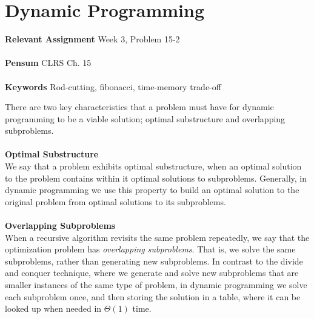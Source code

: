 
\chapter{Dynamic Programming}
\label{ch:dynamicprog}

\textbf{Relevant Assignment} Week 3, Problem 15-2\\\\
\textbf{Pensum} CLRS Ch. 15\\\\
\textbf{Keywords} Rod-cutting, fibonacci, time-memory trade-off
\vspace{1in}

\noindent There are two key characteristics that a problem must have for
dynamic programming to be a viable solution; optimal substructure and
overlapping subproblems.
\\\\
\noindent \textbf{Optimal Substructure}\\
We say that a problem exhibits optimal substructure, when an optimal solution
to the problem contains within it optimal solutions to subproblems. Generally,
in dynamic programming we use this property to build an optimal solution to
the original problem from optimal solutions to its subproblems.
\\\\
\noindent \textbf{Overlapping Subproblems}\\
When a recursive algorithm revisits the same problem repeatedly, we say that
the optimization problem has \textit{overlapping subproblems}. That is, we
solve the same subproblems, rather than generating new subproblems. In
contrast to the divide and conquer technique, where we generate and solve new
subproblems that are smaller instances of the same type of problem, in dynamic
programming we solve each subproblem once, and then storing the solution in a
table, where it can be looked up when needed in $\Theta(1)$ time.

\newpage
